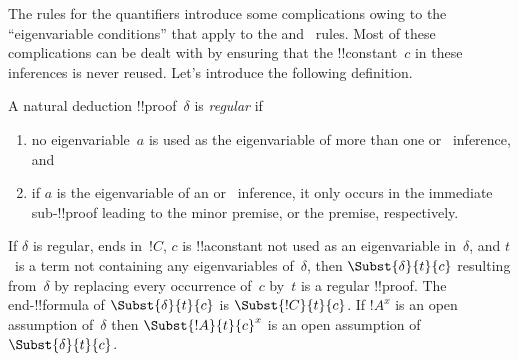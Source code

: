 \documentclass[../../../include/open-logic-section]{subfiles}
\begin{document}


The rules for the quantifiers introduce some complications owing to
the ``eigenvariable conditions'' that apply to the \Elim{\lexists}
and~\Intro{\lforall} rules. Most of these complications can be dealt
with by ensuring that the !!{constant}~$c$ in these inferences is
never reused. Let's introduce the following definition.

\begin{defn}
A natural deduction !!{proof}~$\delta$ is \emph{regular} if
\begin{enumerate}
  \item no eigenvariable~$a$ is used as the eigenvariable of more than
  one \Elim{\lexists} or~\Intro{\lforall} inference, and
  \item if $a$ is the eigenvariable of an \Elim{\lexists}
  or~\Intro{\lforall} inference, it only occurs in the immediate
  sub-!!{proof} leading to the minor premise, or the premise, respectively.
\end{enumerate}
\end{defn}

\begin{lem} If $\delta$ is regular, ends
in~$!C$, $c$ is !!a{constant} not used as an eigenvariable
in~$\delta$, and $t$~is a term not containing any eigenvariables
of~$\delta$, then $\Subst{\delta}{t}{c}$ resulting from~$\delta$ by
replacing every occurrence of~$c$ by~$t$ is a regular !!{proof}. The
end-!!{formula} of $\Subst{\delta}{t}{c}$ is $\Subst{!C}{t}{c}$. If
$!A^x$ is an open assumption of~$\delta$ then $\Subst{!A}{t}{c}^x$ is
an open assumption of~$\Subst{\delta}{t}{c}$.
\end{lem}
\end{document}
